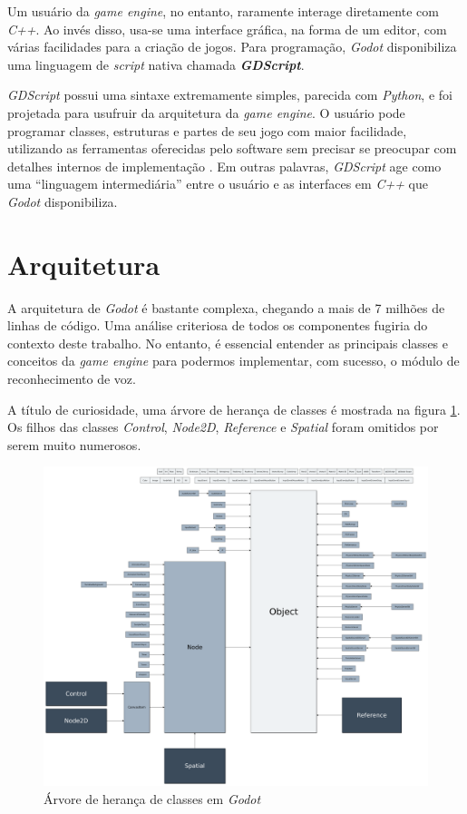 Um usuário da \textit{game engine}, no entanto, raramente interage diretamente com \textit{C++}. Ao invés disso, usa-se uma interface gráfica, na forma de um editor, com várias facilidades para a criação de jogos. Para programação, \textit{Godot} disponibiliza uma linguagem de \textit{script} nativa chamada \mbox{\textbf{\textit{GDScript}}}.

\mbox{\textit{GDScript}} possui uma sintaxe extremamente simples, parecida com \textit{Python}, e foi projetada para usufruir da arquitetura da \textit{game engine}. O usuário pode programar classes, estruturas e partes de seu jogo com maior facilidade, utilizando as ferramentas oferecidas pelo software sem precisar se preocupar com detalhes internos de implementação \citep{godotGDScript}. Em outras palavras, \mbox{\textit{GDScript}} age como uma ``linguagem intermediária'' entre o usuário e as interfaces em \textit{C++} que \textit{Godot} disponibiliza.


\section{Arquitetura}

A arquitetura de \textit{Godot} é bastante complexa, chegando a mais de 7 milhões de linhas de código. Uma análise criteriosa de todos os componentes fugiria do contexto deste trabalho. No entanto, é essencial entender as principais classes e conceitos da \textit{game engine} para podermos implementar, com sucesso, o módulo de reconhecimento de voz.

A título de curiosidade, uma árvore de herança de classes é mostrada na figura \ref{godotClasses}. Os filhos das classes \textit{Control}, \textit{Node2D}, \textit{Reference} e \textit{Spatial} foram omitidos por serem muito numerosos.

\begin{figure}[H]
  \centering
  \includegraphics[width=\textwidth]{image/godot-classes.png}
  \caption{Árvore de herança de classes em \textit{Godot} \citep{godotClasses}}
  \label{godotClasses}
\end{figure}

